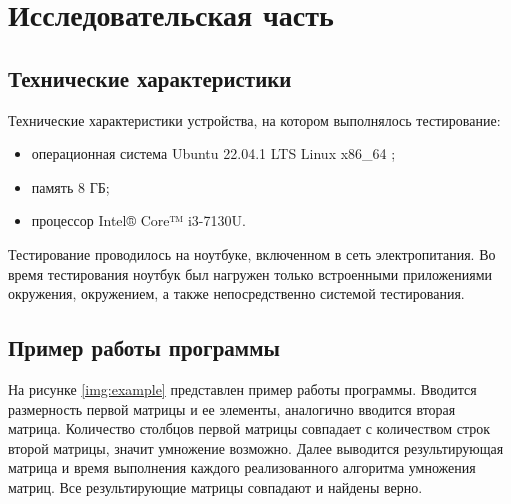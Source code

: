 \chapter{Исследовательская часть}

\section{Технические характеристики}

Технические характеристики устройства, на котором выполнялось тестирование:
\begin{itemize}
	\item операционная система Ubuntu 22.04.1 LTS Linux x86\_64 \cite{ubuntu};
	\item память 8 ГБ;
	\item процессор Intel® Core™ i3-7130U.
\end{itemize}

Тестирование проводилось на ноутбуке, включенном в сеть электропитания. Во время тестирования ноутбук был нагружен только встроенными приложениями окружения, окружением, а также непосредственно системой тестирования.

\section{Пример работы программы}

На рисунке \ref{img:example} представлен пример работы программы. Вводится размерность первой матрицы и ее элементы, аналогично вводится вторая матрица. Количество столбцов первой матрицы совпадает с количеством строк второй матрицы, значит умножение возможно. Далее выводится результирующая матрица и время выполнения каждого реализованного алгоритма умножения матриц. Все результирующие матрицы совпадают и найдены верно.

